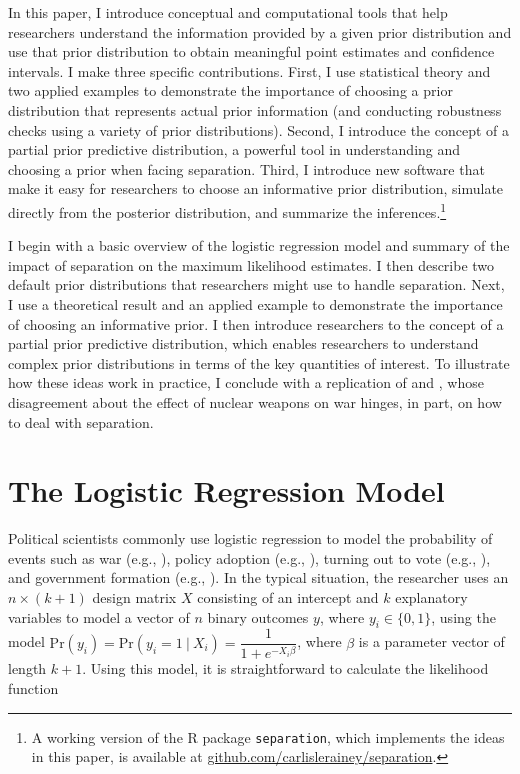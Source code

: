 \documentclass[12pt]{article}
\begin{document}
In this paper, I introduce conceptual and computational tools that help researchers understand the information provided by a given prior distribution and use that prior distribution to obtain meaningful point estimates and confidence intervals. I make three specific contributions. First, I use statistical theory and two applied examples to demonstrate the importance of choosing a prior distribution that represents actual prior information (and conducting robustness checks using a variety of prior distributions). Second, I introduce the concept of a partial prior predictive distribution, a powerful tool in understanding and choosing a prior when facing separation. Third, I introduce new software that make it easy for researchers to choose an informative prior distribution, simulate directly from the posterior distribution, and summarize the inferences.\footnote{A working version of the R package \texttt{separation}, which implements the ideas in this paper, is available at \href{https://github.com/carlislerainey/separation}{github.com/carlislerainey/separation}.}

I begin with a basic overview of the logistic regression model and summary of the impact of separation on the maximum likelihood estimates. I then describe two default prior distributions that researchers might use to handle separation. Next, I use a theoretical result and an applied example to demonstrate the importance of choosing an informative prior. I then introduce researchers to the concept of a partial prior predictive distribution, which enables researchers to understand complex prior distributions in terms of the key quantities of interest. To illustrate how these ideas work in practice, I conclude with a replication of \cite{Rauchhaus2009} and \cite{BellMiller2015}, whose disagreement about the effect of nuclear weapons on war hinges, in part, on how to deal with separation.

\section*{The Logistic Regression Model}

Political scientists commonly use logistic regression to model the probability of events such as war (e.g., \citealt{Fearon1994}), policy adoption (e.g., \citealt{BerryBerry1990}), turning out to vote (e.g., \citealt{WolfingerRosenstone1980}), and government formation (e.g., \citealt{MartinStevenson2001}). In the typical situation, the researcher uses an $n \times (k + 1)$ design matrix $X$ consisting of an intercept and $k$ explanatory variables to model a vector of $n$ binary outcomes $y$, where $y_i \in \{0, 1\}$, using the model $\text{Pr}(y_i) = \text{Pr}(y_i = 1~|~ X_i) = \dfrac{1}{1 + e^{-X_i\beta}}$, where $\beta$ is a parameter vector of length $k + 1$. Using this model, it is straightforward to calculate the likelihood function 
\end{document}
